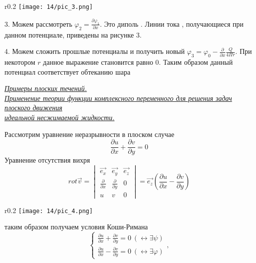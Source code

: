 \begin{wrapfigure}{r}{0.2\textwidth}
  \texttt{[image: 14/pic\_3.png]}
  \caption{\label{ris:image14.3}}
\end{wrapfigure}

3. Можем рассмотреть $\varphi_2 = \frac{\partial \varphi_1} {\partial x}$.  Это диполь . Линии тока , получающиеся при данном потенциале, приведены на рисунке 3.


4. Можем сложить прошлые потенциалы и получить новый $\varphi_3 = \varphi_0 - \frac{\partial}{\partial x} \frac{Q}{4\Pi r}$. При некотором  $r$ данное выражение становится равно 0. Таким образом данный потенциал соответствует обтеканию шара

\newpage

\begin{center}
  \textit{\underline{Примеры плоских течений. }}
  \\
  \textit{\underline{Применение теории функции комплексного
      переменного для решения задач плоского движения }}
  \\
  \textit{\underline{ идеальной несжимаемой жидкости. }}
\end{center}

Рассмотрим уравнение неразрывности в плоском случае
$$
  \frac{\partial u}{\partial x} + \frac{\partial v}{\partial y} = 0
$$
Уравнение отсутствия вихря
$$
  rot \overrightarrow{v} =
  \begin{vmatrix}
    \overrightarrow{e_x}         & \overrightarrow{e_y}         & \overrightarrow{e_z} \\
    \frac{\partial }{\partial x} & \frac{\partial }{\partial y} & 0                    \\
    u                            & v                            & 0\
  \end{vmatrix} = \overrightarrow{e_z} (\frac{\partial u}{\partial x} - \frac{\partial v}{\partial y} )
$$

\begin{wrapfigure}{r}{0.2\textwidth}
  \texttt{[image: 14/pic\_4.png]}
  \caption{\label{ris:image14.4}}
\end{wrapfigure}

таким образом получаем условия Коши-Римана
$$ \begin{cases}
    \frac{\partial u}{\partial x} + \frac{\partial v}{\partial y} = 0  \ (\leftrightarrow \exists \psi) \\
    \frac{\partial u}{\partial x} - \frac{\partial v}{\partial y}  = 0 \ (\leftrightarrow \exists \varphi)
  \end{cases},$$

